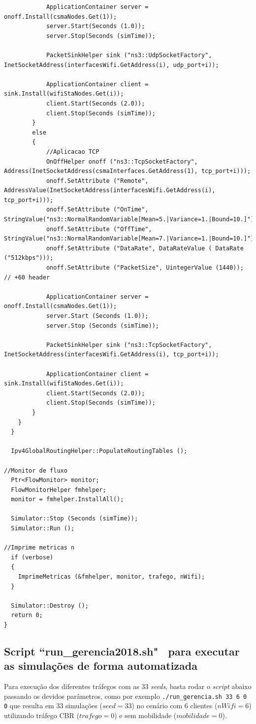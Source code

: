 \documentclass[12pt]{article}
\begin{document}
\begin{lstlisting}
			ApplicationContainer server = onoff.Install(csmaNodes.Get(1));
			server.Start(Seconds (1.0));
			server.Stop(Seconds (simTime));

			PacketSinkHelper sink ("ns3::UdpSocketFactory", InetSocketAddress(interfacesWifi.GetAddress(i), udp_port+i));

			ApplicationContainer client = sink.Install(wifiStaNodes.Get(i));
			client.Start(Seconds (2.0));
			client.Stop(Seconds (simTime));
		}
  		else
  		{
			//Aplicacao TCP
			OnOffHelper onoff ("ns3::TcpSocketFactory", Address(InetSocketAddress(csmaInterfaces.GetAddress(1), tcp_port+i)));
			onoff.SetAttribute ("Remote",  AddressValue(InetSocketAddress(interfacesWifi.GetAddress(i), tcp_port+i)));
			onoff.SetAttribute ("OnTime", StringValue("ns3::NormalRandomVariable[Mean=5.|Variance=1.|Bound=10.]"));
			onoff.SetAttribute ("OffTime", StringValue("ns3::NormalRandomVariable[Mean=7.|Variance=1.|Bound=10.]"));
			onoff.SetAttribute ("DataRate", DataRateValue ( DataRate ("512kbps")));
			onoff.SetAttribute ("PacketSize", UintegerValue (1440)); // +60 header

			ApplicationContainer server = onoff.Install(csmaNodes.Get(1));
			server.Start (Seconds (1.0));
			server.Stop (Seconds (simTime));

			PacketSinkHelper sink ("ns3::TcpSocketFactory", InetSocketAddress(interfacesWifi.GetAddress(i), tcp_port+i));

			ApplicationContainer client = sink.Install(wifiStaNodes.Get(i));
			client.Start(Seconds (2.0));
			client.Stop(Seconds (simTime));
  		}
  	}
  }

  Ipv4GlobalRoutingHelper::PopulateRoutingTables ();

//Monitor de fluxo
  Ptr<FlowMonitor> monitor;
  FlowMonitorHelper fmhelper;
  monitor = fmhelper.InstallAll();

  Simulator::Stop (Seconds (simTime));
  Simulator::Run ();

//Imprime metricas n
  if (verbose)
  {
    ImprimeMetricas (&fmhelper, monitor, trafego, nWifi);
  }

  Simulator::Destroy ();
  return 0;
}
\end{lstlisting}

\subsection*{Script ``run\_gerencia2018.sh" ~para executar as simulações de forma automatizada}

Para execução dos diferentes tráfegos com as 33 \textit{seeds}, basta rodar o \textit{script} abaixo passando os devidos parâmetros, como por exemplo \texttt{./run\_gerencia.sh 33 6 0 0} que resulta em 33 simulações ($seed = 33$) no cenário com 6 clientes ($nWifi = 6$) utilizando tráfego CBR ($trafego = 0$) e sem mobilidade ($mobilidade = 0$).
\end{document}
